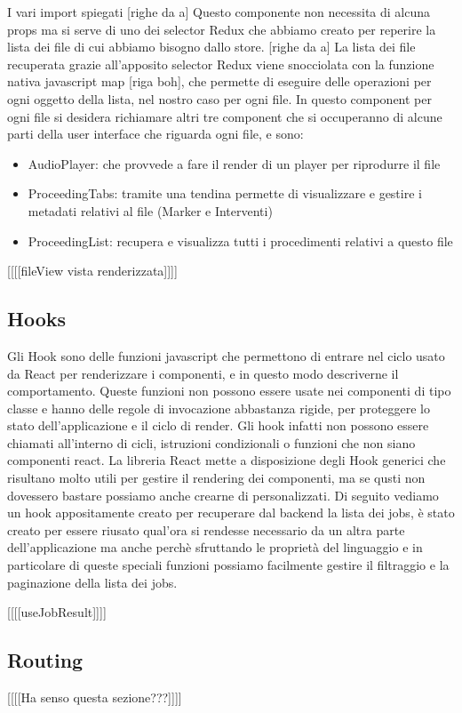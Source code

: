 {I vari import spiegati [righe da a]}
Questo componente non necessita di alcuna props ma si serve di uno dei selector Redux che abbiamo creato per reperire la lista dei file di cui abbiamo bisogno dallo store. [righe da a]
La lista dei file recuperata grazie all'apposito selector Redux viene snocciolata con la funzione nativa javascript map [riga boh], che permette di eseguire delle operazioni per ogni oggetto della lista, nel nostro caso per ogni file.
In questo component per ogni file si desidera richiamare altri tre component che si occuperanno di alcune parti della user interface che riguarda ogni file, e sono:
\begin{itemize}
  \item AudioPlayer: che provvede a fare il render di un player per riprodurre il file
  \item ProceedingTabs: tramite una tendina permette di visualizzare e gestire i metadati relativi al file (Marker e Interventi)
  \item ProceedingList: recupera e visualizza tutti i procedimenti relativi a questo file
\end{itemize}
[[[[fileView vista renderizzata]]]]
\subsection{Hooks}
Gli Hook sono delle funzioni javascript che permettono di entrare nel ciclo usato da React per renderizzare i componenti, e in questo modo descriverne il comportamento.
Queste funzioni non possono essere usate nei componenti di tipo classe e hanno delle regole di invocazione abbastanza rigide, per proteggere lo stato dell'applicazione e il ciclo di render.
Gli hook infatti non possono essere chiamati all'interno di cicli, istruzioni condizionali o funzioni che non siano componenti react. La libreria React mette a disposizione degli Hook generici che risultano molto utili
per gestire il rendering dei componenti, ma se qusti non dovessero bastare possiamo anche crearne di personalizzati. Di seguito vediamo un hook appositamente creato per recuperare dal backend la lista dei jobs,
è stato creato per essere riusato qual'ora si rendesse necessario da un altra parte dell'applicazione ma anche perchè sfruttando le proprietà del linguaggio e in particolare di queste speciali funzioni possiamo
facilmente gestire il filtraggio e la paginazione della lista dei jobs.

  [[[[useJobResult]]]]
\subsection{Routing}
[[[[Ha senso questa sezione???]]]]

